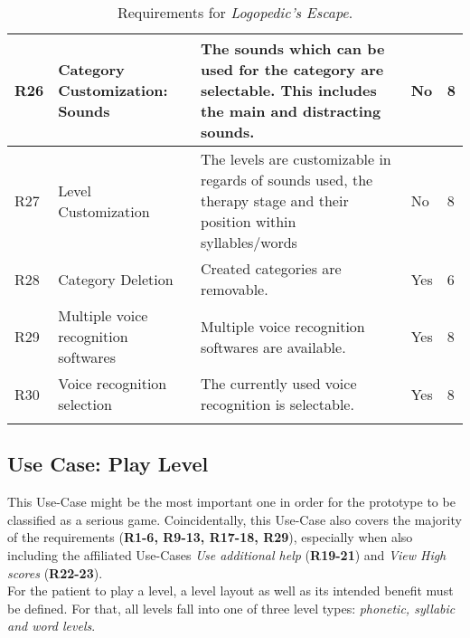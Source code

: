 \documentclass[draft,final]{vutinfth} %
\begin{document}
\begin{longtable}[h]{|p{}|p{}|p{}|p{}|p{}|}
R26 & Category Customization: Sounds & The sounds which can be used for the category are selectable. This includes the main and distracting sounds. & No & 8 \\ \hline
R27 & Level Customization & The levels are customizable in regards of sounds used, the therapy stage and their position within syllables/words & No & 8 \\ \hline
R28 & Category Deletion & Created categories are removable. & Yes & 6 \\ \hline
R29 & Multiple voice recognition softwares & Multiple voice recognition softwares are available. & Yes & 8 \\ \hline
R30 & Voice recognition selection &  The currently used  voice recognition is selectable. & Yes & 8 \\ \hline



\caption{Requirements for \emph{Logopedic's Escape}.}
\label{tbl:requirements}
\end{longtable}

\subsection{Use Case: Play Level}
\label{sec:playLevel}
This Use-Case might be the most important one in order for the prototype to be classified as a serious game. Coincidentally, this Use-Case also covers the majority of the requirements (\textbf{R1-6, R9-13, R17-18, R29}), especially when also including the affiliated Use-Cases \emph{Use additional help} (\textbf{R19-21}) and \emph{View High scores} (\textbf{R22-23}). \\
For the patient to play a level, a level layout as well as its intended benefit must be defined. For that, all levels fall into one of three level types: \emph{phonetic, syllabic and word levels}.
\end{document}
